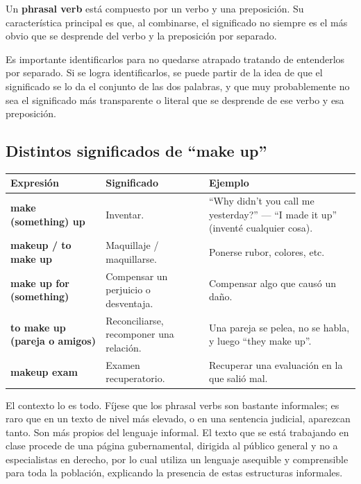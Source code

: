 \documentclass[12pt,oneside]{book}
\begin{document}
Un \textbf{phrasal verb} está compuesto por un verbo y una preposición. Su característica principal es que, al combinarse, el significado no siempre es el más obvio que se desprende del verbo y la preposición por separado. 

Es importante identificarlos para no quedarse atrapado tratando de entenderlos por separado. Si se logra identificarlos, se puede partir de la idea de que el significado se lo da el conjunto de las dos palabras, y que muy probablemente no sea el significado más transparente o literal que se desprende de ese verbo y esa preposición.

\subsection*{Distintos significados de ``make up''}

\begin{table}[H]
\centering
\begin{tabularx}{\textwidth}{p{3cm} X X}
\toprule
\textbf{Expresión} & \textbf{Significado} & \textbf{Ejemplo} \\
\midrule
\textbf{make (something) up} & Inventar. & ``Why didn't you call me yesterday?'' --- ``I made it up'' (inventé cualquier cosa). \\
\midrule
\textbf{makeup / to make up} & Maquillaje / maquillarse. & Ponerse rubor, colores, etc. \\
\midrule
\textbf{make up for (something)} & Compensar un perjuicio o desventaja. & Compensar algo que causó un daño. \\
\midrule
\textbf{to make up (pareja o amigos)} & Reconciliarse, recomponer una relación. & Una pareja se pelea, no se habla, y luego ``they make up''. \\
\midrule
\textbf{makeup exam} & Examen recuperatorio. & Recuperar una evaluación en la que salió mal. \\
\bottomrule
\end{tabularx}
\end{table}

El contexto lo es todo. Fíjese que los phrasal verbs son bastante informales; es raro que en un texto de nivel más elevado, o en una sentencia judicial, aparezcan tanto. Son más propios del lenguaje informal. El texto que se está trabajando en clase procede de una página gubernamental, dirigida al público general y no a especialistas en derecho, por lo cual utiliza un lenguaje asequible y comprensible para toda la población, explicando la presencia de estas estructuras informales.
\end{document}
